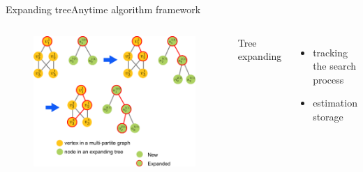 \begin{frame}{Expanding tree}{Anytime algorithm framework}

\begin{columns}

\begin{minipage}{\textwidth}
\begin{figure}
\centering
\includegraphics[width=\textwidth]{./figure/tree_expanding_process}
\end{figure}
\end{minipage}


\begin{minipage}{\textwidth}

Tree expanding

\begin{itemize}
\item tracking the search process
\item estimation storage
\end{itemize}
\end{minipage}

\end{columns}

\end{frame}


